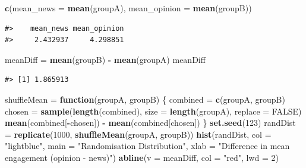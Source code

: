 \documentclass[
  10pt,
]{article}
\newenvironment{Shaded}{\begin{snugshade}}{\end{snugshade}}
\newcommand{\AttributeTok}[1]{\textcolor[rgb]{0.13,0.29,0.53}{#1}}
\newcommand{\ConstantTok}[1]{\textcolor[rgb]{0.56,0.35,0.01}{#1}}
\newcommand{\ControlFlowTok}[1]{\textcolor[rgb]{0.13,0.29,0.53}{\textbf{#1}}}
\newcommand{\DecValTok}[1]{\textcolor[rgb]{0.00,0.00,0.81}{#1}}
\newcommand{\FunctionTok}[1]{\textcolor[rgb]{0.13,0.29,0.53}{\textbf{#1}}}
\newcommand{\NormalTok}[1]{#1}
\newcommand{\OtherTok}[1]{\textcolor[rgb]{0.56,0.35,0.01}{#1}}
\newcommand{\SpecialCharTok}[1]{\textcolor[rgb]{0.81,0.36,0.00}{\textbf{#1}}}
\newcommand{\StringTok}[1]{\textcolor[rgb]{0.31,0.60,0.02}{#1}}
\begin{document}
\begin{Shaded}
\begin{Highlighting}[]
\FunctionTok{c}\NormalTok{(}\AttributeTok{mean\_news =} \FunctionTok{mean}\NormalTok{(groupA), }\AttributeTok{mean\_opinion =} \FunctionTok{mean}\NormalTok{(groupB))}
\end{Highlighting}
\end{Shaded}

\begin{verbatim}
#>    mean_news mean_opinion 
#>     2.432937     4.298851
\end{verbatim}

\begin{Shaded}
\begin{Highlighting}[]
\NormalTok{meanDiff }\OtherTok{=} \FunctionTok{mean}\NormalTok{(groupB) }\SpecialCharTok{{-}} \FunctionTok{mean}\NormalTok{(groupA)}
\NormalTok{meanDiff}
\end{Highlighting}
\end{Shaded}

\begin{verbatim}
#> [1] 1.865913
\end{verbatim}

\begin{Shaded}
\begin{Highlighting}[]
\NormalTok{shuffleMean }\OtherTok{=} \ControlFlowTok{function}\NormalTok{(groupA, groupB) \{}
\NormalTok{  combined }\OtherTok{=} \FunctionTok{c}\NormalTok{(groupA, groupB)}
\NormalTok{  chosen }\OtherTok{=} \FunctionTok{sample}\NormalTok{(}\FunctionTok{length}\NormalTok{(combined), }\AttributeTok{size =} \FunctionTok{length}\NormalTok{(groupA), }\AttributeTok{replace =} \ConstantTok{FALSE}\NormalTok{)}
  \FunctionTok{mean}\NormalTok{(combined[}\SpecialCharTok{{-}}\NormalTok{chosen]) }\SpecialCharTok{{-}} \FunctionTok{mean}\NormalTok{(combined[chosen])}
\NormalTok{\}}
\FunctionTok{set.seed}\NormalTok{(}\DecValTok{123}\NormalTok{)}
\NormalTok{randDist }\OtherTok{=} \FunctionTok{replicate}\NormalTok{(}\DecValTok{1000}\NormalTok{, }\FunctionTok{shuffleMean}\NormalTok{(groupA, groupB))}
\FunctionTok{hist}\NormalTok{(randDist, }\AttributeTok{col =} \StringTok{"lightblue"}\NormalTok{, }\AttributeTok{main =} \StringTok{"Randomisation Distribution"}\NormalTok{,}
     \AttributeTok{xlab =} \StringTok{"Difference in mean engagement (opinion {-} news)"}\NormalTok{)}
\FunctionTok{abline}\NormalTok{(}\AttributeTok{v =}\NormalTok{ meanDiff, }\AttributeTok{col =} \StringTok{"red"}\NormalTok{, }\AttributeTok{lwd =} \DecValTok{2}\NormalTok{)}
\end{Highlighting}
\end{Shaded}
\end{document}
